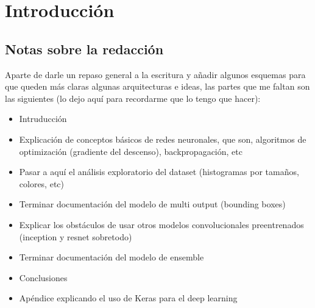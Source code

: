
\chapter{Introducción} %

\label{Chapter1} %


\newcommand{\keyword}[1]{\textbf{#1}}
\newcommand{\tabhead}[1]{\textbf{#1}}
\newcommand{\code}[1]{\texttt{#1}}
\newcommand{\file}[1]{\texttt{\bfseries#1}}
\newcommand{\option}[1]{\texttt{\itshape#1}}


\section{Notas sobre la redacción}

Aparte de darle un repaso general a la escritura y añadir algunos esquemas para que queden más claras algunas arquitecturas e ideas, las partes que me faltan son las siguientes (lo dejo aquí para recordarme que lo tengo que hacer):

\begin{itemize}
    \item{Intruducción}
    \item{Explicación de conceptos básicos de redes neuronales, que son, algoritmos de optimización (gradiente del descenso), backpropagación, etc}
    \item{Pasar a aquí el análisis exploratorio del dataset (histogramas por tamaños, colores, etc)}
    \item{Terminar documentación del modelo de multi output (bounding boxes)}
    \item{Explicar los obstáculos de usar otros modelos convolucionales preentrenados (inception y resnet sobretodo)}
    \item{Terminar documentación del modelo de ensemble}
    \item{Conclusiones}
    \item{Apéndice explicando el uso de Keras para el deep learning}
\end{itemize}




